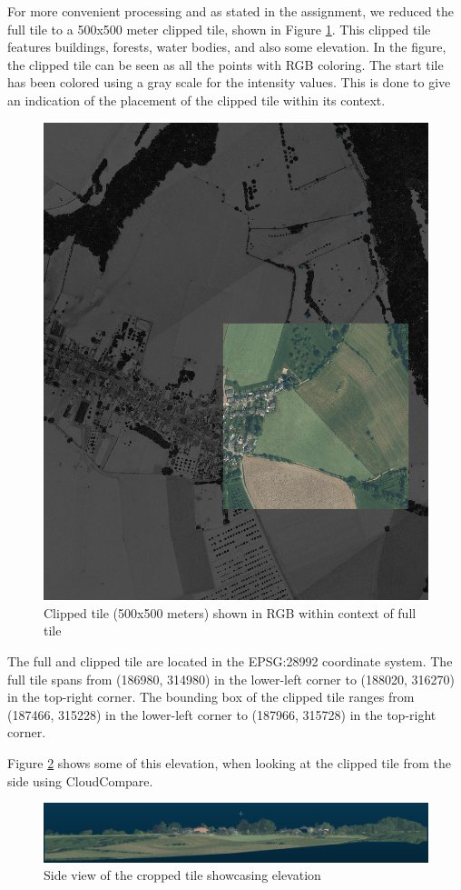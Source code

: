 \documentclass{article}
\begin{document}
For more convenient processing and as stated in the assignment, we reduced the full tile to a 500x500 meter clipped tile, shown in Figure \ref{fig:cropped_front}. This clipped tile features buildings, forests, water bodies, and also some elevation. In the figure, the clipped tile can be seen as all the points with RGB coloring. The start tile has been colored using a gray scale for the intensity values. This is done to give an indication of the placement of the clipped tile within its context. 

\begin{figure}[h]
  \centering
  \includegraphics[width=0.5\linewidth]{img/screenshot_cropped_front.png}
  \caption{Clipped tile (500x500 meters) shown in RGB within context of full tile}
  \label{fig:cropped_front}
\end{figure}
The full and clipped tile are located in the EPSG:28992 coordinate system. The full tile spans from (186980, 314980) in the lower-left corner to (188020, 316270) in the top-right corner. The bounding box of the clipped tile ranges from (187466, 315228) in the lower-left corner to (187966, 315728) in the top-right corner.


Figure \ref{fig:cropped_elevation} shows some of this elevation, when looking at the clipped tile from the side using CloudCompare.

\begin{figure}[h]
  \centering
  \includegraphics[width=0.5\linewidth]{img/screenshot_cropped_elevation.png}
  \caption{Side view of the cropped tile showcasing elevation}
  \label{fig:cropped_elevation}
\end{figure}
\newpage
\end{document}
